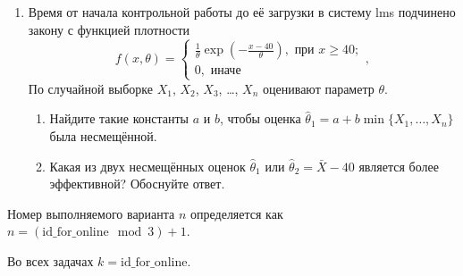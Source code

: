 \documentclass[12pt]{article}
\newcommand \id {\mathrm{id}\_\mathrm{for}\_\mathrm{online}}
\begin{document}
\begin{enumerate}
\item  Время от начала контрольной работы до её загрузки в систему lms  подчинено закону с функцией плотности
\[
  f(x, \theta) = \begin{cases}
    \frac{1}{\theta}\exp\left(-\frac{x-40}{\theta}\right), \text{ при } x\geq 40; \\
    0, \text{ иначе}
  \end{cases},    
\]
По случайной выборке $X_1$, $X_2$, $X_3$, \ldots, $X_n$ оценивают параметр $\theta$. 

\begin{enumerate}
\item Найдите такие константы $a$ и $b$, чтобы оценка  $\hat \theta_1 = a + b\min\{X_1, \ldots, X_n\}$ была несмещённой.
\item Какая из двух несмещённых оценок $\hat \theta_1$ или $\hat \theta_2 = \bar X - 40$ является более эффективной? Обоснуйте ответ.
\end{enumerate}

\end{enumerate}

\newpage
Номер выполняемого варианта $n$ определяется как $n=(\id \mod 3)+1$. 

Во всех задачах $k=\id$.
\end{document}

